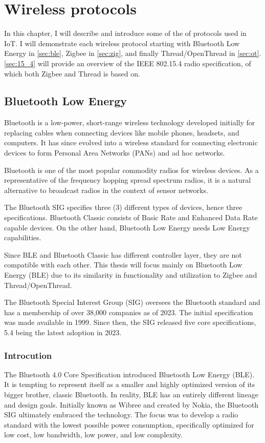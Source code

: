\section{Wireless protocols}
\label{chap:wireless}

In this chapter, I will describe and introduce some of the of protocols used in IoT.
I will demonstrate each wireless protocol starting with Bluetooth Low Energy in \autoref{sec:ble},
Zigbee in \autoref{sec:zig}, and finally Thread/OpenThread in \autoref{sec:ot}.
\autoref{sec:15_4} will provide an overview of the IEEE 802.15.4 radio specification, of which both Zigbee and Thread is based on.

\subsection{Bluetooth Low Energy}
\label{sec:ble}

Bluetooth is a low-power, short-range wireless technology developed initially for replacing cables when connecting devices like mobile phones, headsets, and computers. It has since evolved into a wireless standard for connecting electronic devices to form Personal Area Networks (PANs) and ad hoc networks. \cite{Dideles03}

Bluetooth is one of the most popular commodity radios for wireless devices.
As a representative of the frequency hopping spread spectrum radios,
it is a natural alternative to broadcast radios in the context of sensor networks. \cite{Leopold03}

The Bluetooth SIG specifies three (3) different types of devices, hence three specifications.
Bluetooth Classic consists of Basic Rate and Enhanced Data Rate capable devices.
On the other hand, Bluetooth Low Energy needs Low Energy capabilities.

Since BLE and Bluetooth Classic has different controller layer, they are not compatible with each other.
This thesis will focus mainly on Bluetooth Low Energy (BLE) due to its
similarity in functionality and utilization to Zigbee and Thread/OpenThread.


The Bluetooth Special Interest Group (SIG) oversees
the Bluetooth standard and has a membership of over 38,000 companies as of 2023. \cite{bt_history}
The initial specification was made available in 1999.
Since then, the SIG released five core specifications, 5.4 being the latest adoption in 2023. \cite{bt_spec_history}

\subsubsection{Introcution}
\label{ble:int}
The Bluetooth 4.0 Core Specification introduced Bluetooth Low Energy (BLE).
It is tempting to represent itself as a smaller and highly optimized version of
its bigger brother, classic Bluetooth. In reality, BLE has an entirely different lineage and design goals.
Initially known as Wibree and created by Nokia, the Bluetooth SIG ultimately embraced the technology.
The focus was to develop a radio standard with the lowest possible power consumption,
specifically optimized for low cost, low bandwidth, low power, and low complexity. \cite{Townsend14}

